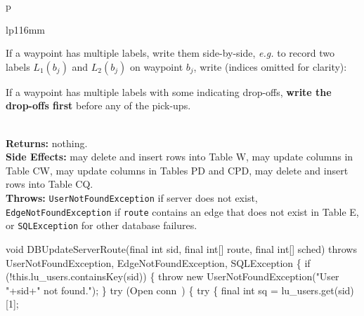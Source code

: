 \begin{tabular}{p{\textwidth}}
\begin{tabular}{lp{116mm}}

If a waypoint has multiple labels, write them side-by-side, \textit{e.g.}
to record two labels $L_1(b_j)$ and $L_2(b_j)$ on waypoint $b_j$, write
(indices omitted for clarity):


If a waypoint has multiple labels with some indicating drop-offs, \textbf{write
the drop-offs first} before any of the pick-ups.
\end{tabular}\\
\textbf{Returns:} nothing.\\
\textbf{Side Effects:} may delete and insert rows into Table W, may
update columns in Table CW, may update columns in Tables PD and CPD,
may delete and insert rows into Table CQ.\\
\textbf{Throws:} {\tt{}UserNotFoundException} if server does not exist,
{\tt{}EdgeNotFoundException} if {\tt{}route} contains an edge that does not exist in
Table E, or {\tt{}SQLException} for other database failures.\\
\bottomrule
\end{tabular}
\nwenddocs{}\endmoddef{}
void DBUpdateServerRoute(final int sid, final int[] route, final int[] sched)
throws UserNotFoundException, EdgeNotFoundException, SQLException \{
  if (!this.lu_users.containsKey(sid)) \{
    throw new UserNotFoundException("User "+sid+" not found.");
  \}
  try (\LA{}Open \code{}conn\edoc{}~{\nwtagstyle{}}\RA{}) \{
    try \{
      final int sq = lu_users.get(sid)[1];
